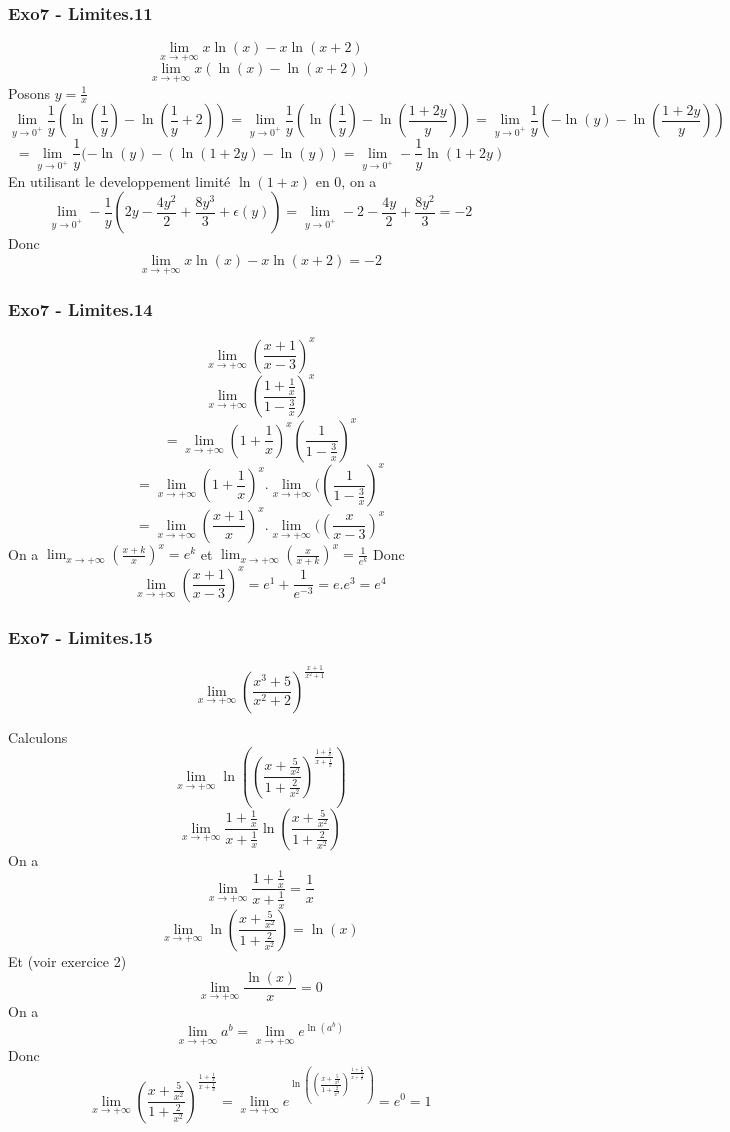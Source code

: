 \documentclass[]{book}
\theoremstyle{definition}
\begin{document}
\subsubsection*{Exo7 - Limites.11}
$$\lim_{x \to +\infty}x\ln(x)-x\ln(x+2)$$
$$\lim_{x \to +\infty}x(\ln(x)-\ln(x+2))$$
Posons $y = \frac{1}{x}$
$$\lim_{y \to 0^+} \frac{1}{y}\left(\ln(\frac{1}{y})-\ln(\frac{1}{y}+2)\right) = \lim_{y \to 0^+} \frac{1}{y}\left(\ln(\frac{1}{y})-\ln(\frac{1+2y}{y})\right) = \lim_{y \to 0^+} \frac{1}{y}\left(-\ln(y)-\ln(\frac{1+2y}{y})\right) $$
$$= \lim_{y \to 0^+} \frac{1}{y}(-\ln(y)-(\ln(1+2y)-\ln(y)) = \lim_{y \to 0^+} -\frac{1}{y}\ln(1+2y)$$
En utilisant le developpement limit\'e $\ln(1+x)$ en 0, on a
$$\lim_{y \to 0^+} -\frac{1}{y}(2y - \frac{4y^2}{2} + \frac{8y^3}{3}+\epsilon(y)) = \lim_{y \to 0^+} -2 - \frac{4y}{2} + \frac{8y^2}{3} = -2$$
Donc
$$\lim_{x \to +\infty}x\ln(x)-x\ln(x+2) = -2$$


\subsubsection*{Exo7 - Limites.14}
$$\lim_{x \to +\infty}\left(\frac{x+1}{x-3}\right)^x$$
$$\lim_{x \to +\infty}\left(\frac{1+\frac{1}{x}}{1-\frac{3}{x}}\right)^x$$
$$= \lim_{x \to +\infty}(1+\frac{1}{x})^x\left(\frac{1}{1-\frac{3}{x}}\right)^x$$
$$= \lim_{x \to +\infty}(1+\frac{1}{x})^x . \lim_{x \to +\infty}(\left(\frac{1}{1-\frac{3}{x}}\right)^x$$
$$= \lim_{x \to +\infty}\left(\frac{x+1}{x}\right)^x . \lim_{x \to +\infty}(\left(\frac{x}{x-3}\right)^x$$
On a $\lim_{x \to +\infty}\left(\frac{x+k}{x}\right)^x = {e^k}$ et $\lim_{x \to +\infty}\left(\frac{x}{x+k}\right)^x = \frac{1}{e^k}$ 
Donc
$$\lim_{x \to +\infty}\left(\frac{x+1}{x-3}\right)^x = e^1 + \frac{1}{e^{-3}} = e.e^3= e^4$$


\subsubsection*{Exo7 - Limites.15}
$$\lim_{x \to +\infty}\left(\frac{x^3+5}{x^2+2}\right)^{\frac{x+1}{x^2+1}}$$

Calculons 
$$\lim_{x \to +\infty}\ln\left(\left(\frac{x+\frac{5}{x^2}}{1+\frac{2}{x^2}}\right)^{\frac{1+\frac{1}{x}}{x+\frac{1}{x}}}\right)$$
$$\lim_{x \to +\infty} \frac{1+\frac{1}{x}}{x+\frac{1}{x}} \ln\left(\frac{x+\frac{5}{x^2}}{1+\frac{2}{x^2}}\right)$$
On a 
$$\lim_{x \to +\infty} \frac{1+\frac{1}{x}}{x+\frac{1}{x}} = \frac{1}{x}$$
$$\lim_{x \to +\infty} \ln\left(\frac{x+\frac{5}{x^2}}{1+\frac{2}{x^2}}\right) = \ln(x)$$
Et (voir exercice 2)
$$\lim_{x \to +\infty} \frac{\ln(x)}{x} = 0$$
On a 
$$\lim_{x \to +\infty} a^b = \lim_{x \to +\infty} e^{\ln(a^b)}$$
Donc
$$\lim_{x \to +\infty} \left(\frac{x+\frac{5}{x^2}}{1+\frac{2}{x^2}}\right)^{\frac{1+\frac{1}{x}}{x+\frac{1}{x}}} = \lim_{x \to +\infty}e^{\ln\left(\left(\frac{x+\frac{5}{x^2}}{1+\frac{2}{x^2}}\right)^{\frac{1+\frac{1}{x}}{x+\frac{1}{x}}}\right)} = e^0 = 1$$
\end{document}
